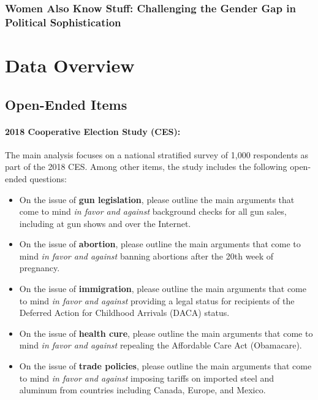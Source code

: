 \clearpage
\singlespacing
\renewcommand\thesubsection{\Roman{subsection}}
\setcounter{page}{1}
\appendices
\subsubsection*{Women Also Know Stuff: Challenging the Gender Gap in Political Sophistication}
\startcontents[sections]
\thispagestyle{empty}
\clearpage
\newpage\setcounter{page}{1}

\section{Data Overview}\label{app:variables}

\subsection{Open-Ended Items}

\paragraph{2018 Cooperative Election Study (CES):}
The main analysis focuses on a national stratified survey of 1,000 respondents as part of the 2018 CES. Among other items, the study includes the following open-ended questions:
\begin{itemize}
	\item On the issue of \textbf{gun legislation}, please outline the main arguments that come to mind \textit{in favor and against} background checks for all gun sales, including at gun shows and over the Internet.
	\item On the issue of \textbf{abortion}, please outline the main arguments that come to mind \textit{in favor and against} banning abortions after the 20th week of pregnancy.
	\item On the issue of \textbf{immigration}, please outline the main arguments that come to mind \textit{in favor and against} providing a legal status for recipients of the Deferred Action for Childhood Arrivals (DACA) status.
	\item On the issue of \textbf{health cure}, please outline the main arguments that come to mind \textit{in favor and against} repealing the Affordable Care Act (Obamacare).
	\item On the issue of \textbf{trade policies}, please outline the main arguments that come to mind \textit{in favor and against} imposing tariffs on imported steel and aluminum from countries including Canada, Europe, and Mexico.
\end{itemize}

